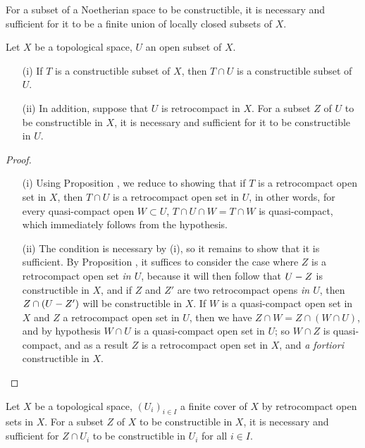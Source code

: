 \begin{corollary}[9.1.7]
\label{0.9.1.7}
For a subset of a Noetherian space to be constructible, it is necessary and sufficient for it to be a finite union of locally closed subsets of $X$.
\end{corollary}

\begin{proposition}[9.1.8]
\label{0.9.1.8}
Let $X$ be a topological space, $U$ an open subset of $X$.
\begin{enumerate}
  \item[{\rm(i)}] If $T$ is a constructible subset of $X$, then $T\cap U$ is a constructible subset of $U$.
  \item[{\rm(ii)}] In addition, suppose that $U$ is retrocompact in $X$. For a subset $Z$ of $U$ to be constructible in $X$, it is necessary and sufficient for it to be constructible in $U$.
\end{enumerate}
\end{proposition}

\begin{proof}
\medskip\noindent
\begin{enumerate}
  \item[(i)] Using Proposition , we reduce to showing that if $T$ is a retrocompact open set in $X$, then $T\cap U$ is a retrocompact open set in $U$, in other words, for every quasi-compact open $W\subset U$, $T\cap U\cap W=T\cap W$ is quasi-compact, which immediately follows from the hypothesis.
  \item[(ii)] The condition is necessary by (i), so it remains to show that it is sufficient.
    By Proposition , it suffices to consider the case where $Z$ is a retrocompact open set \emph{in $U$}, because it will then follow that $U- Z$ is constructible in $X$, and if $Z$ and $Z'$ are two retrocompact opens \emph{in $U$}, then $Z\cap(U- Z')$ will be constructible in $X$.
    If $W$ is a quasi-compact open set in $X$ and $Z$ a retrocompact open set in $U$, then we have $Z\cap W=Z\cap(W\cap U)$, and by hypothesis $W\cap U$ is a quasi-compact open set in $U$; so $W\cap Z$ is quasi-compact, and as a result $Z$ is a retrocompact open set in $X$, and \emph{a fortiori} constructible in $X$.
\end{enumerate}
\end{proof}

\begin{corollary}[9.1.9]
\label{0.9.1.9}
Let $X$ be a topological space, $(U_i)_{i\in I}$ a finite cover of $X$ by retrocompact open sets in $X$.
For a subset $Z$ of $X$ to be constructible in $X$, it is necessary and sufficient for $Z\cap U_i$ to be constructible in $U_i$ for all $i\in I$.
\end{corollary}

